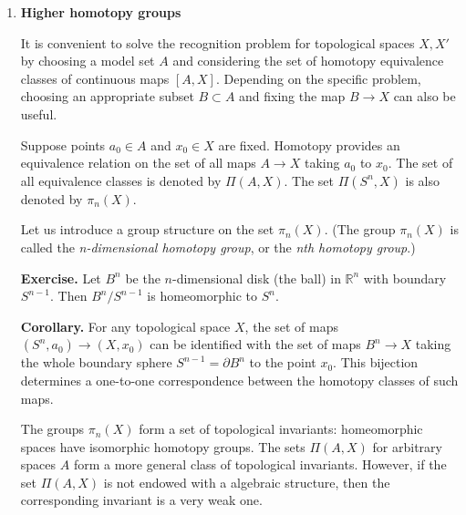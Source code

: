 \documentclass{ctexart}
\begin{document}
\begin{enumerate}
    The formal definition is
    \[
    X * Y = X \times [-1,1] \times Y / \sim,
    \]
where the equivalence relation is given by the following rule:
\begin{adjustwidth}{2em}{}
  for $\lambda \neq -1,1$ each point $(x,\lambda,y)$ is equivalent only to itself;

  $(x,-1,y) \sim (x,-1,y')$ for all $x \in X$ and $y,y' \in Y$;

  $(x,1,y) \sim (x',1,y)$ for all $x,x' \in X$ and $y \in Y$.
\end{adjustwidth}

\textbf{定义.} 拓扑空间 $X$ 称为\textit{列紧的}, 若 $X$ 中任意无限点列 $x_1,x_2,\cdots$ 有一个收敛于 $X$ 中某点的无限子列.

\item \textbf{Higher homotopy groups}

It is convenient to solve the recognition problem for topological spaces $X,X'$ by choosing a model set $A$ and considering the set of homotopy equivalence classes of continuous maps $[A,X]$. Depending on the specific problem, choosing an appropriate subset $B \subset A$ and fixing the map $B \to X$ can also be useful.

\qquad Suppose points $a_0 \in A$ and $x_0 \in X$ are fixed. Homotopy provides an equivalence relation on the set of all maps $A \to X$ taking $a_0$ to $x_0$. The set of all equivalence classes is denoted by $\Pi(A,X)$. The set $\Pi(S^n,X)$ is also denoted by $\pi_n(X)$.

\qquad Let us introduce a group structure on the set $\pi_n(X)$. (The group $\pi_n(X)$ is called the \textit{n-dimensional homotopy group}, or the \textit{nth homotopy group}.)

\textbf{Exercise.} Let $B^n$ be the $n$-dimensional disk (the ball) in $\mathbb{R}^n$ with boundary $S^{n-1}$. Then $B^n/S^{n-1}$ is homeomorphic to $S^n$.

\textbf{Corollary.} For any topological space $X$, the set of maps $(S^n,a_0) \to (X, x_0)$ can be identified with the set of maps $B^n \to X$ taking the whole boundary sphere $S^{n-1} = \partial B^n$ to the point $x_0$. This bijection determines a one-to-one correspondence between the homotopy classes of such maps.

\qquad The groups $\pi_n(X)$ form a set of topological invariants: homeomorphic spaces have isomorphic homotopy groups. The sets $\Pi(A,X)$ for arbitrary spaces $A$ form a more general class of topological invariants. However, if the set $\Pi(A,X)$ is not endowed with a algebraic structure, then the corresponding invariant is a very weak one.


\end{enumerate}
\end{document}
